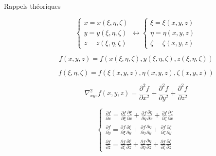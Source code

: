 \documentclass
[
a4paper,                      %
twoside,					  %
12pt,                         %
abstract,		      %
fleqn,                        %
]
{scrartcl} %
\begin{document}
\begin{description}

\item[Rappels th\'eoriques]

\begin{equation}
\begin{cases}
x=x\left(\xi,\eta,\zeta\right)\\
y=y\left(\xi,\eta,\zeta\right)\\
z=z\left(\xi,\eta,\zeta\right)
\end{cases}\longleftrightarrow\begin{cases}
\xi=\xi\left(x,y,z\right)\\
\eta=\eta\left(x,y,z\right)\\
\zeta=\zeta\left(x,y,z\right)
\end{cases}
\end{equation}

\begin{equation}
f\left(x,y,z\right)=f\left(x\left(\xi,\eta,\zeta\right),y\left(\xi,\eta,\zeta\right),z\left(\xi,\eta,\zeta\right)\right)
\end{equation}

\begin{equation}
f\left(\xi,\eta,\zeta\right)=f\left(\xi\left(x,y,z\right),\eta\left(x,y,z\right),\zeta\left(x,y,z\right)\right)
\end{equation}

\begin{equation}
\nabla_{xyz}^{2}f\left(x,y,z\right)=\frac{\partial^{2} f}{\partial x^{2}}+\frac{\partial^{2} f}{\partial y^{2}}+\frac{\partial^{2} f}{\partial z^{2}}
\end{equation}

\begin{equation}
\begin{cases}
\frac{\partial f}{\partial x}=\frac{\partial f}{\partial\xi}\frac{\partial\xi}{\partial x}+\frac{\partial f}{\partial\eta}\frac{\partial\eta}{\partial x}+\frac{\partial f}{\partial\zeta}\frac{\partial\zeta}{\partial x}\\[5pt]
\frac{\partial f}{\partial y}=\frac{\partial f}{\partial\xi}\frac{\partial\xi}{\partial y}+\frac{\partial f}{\partial\eta}\frac{\partial\eta}{\partial y}+\frac{\partial f}{\partial\zeta}\frac{\partial\zeta}{\partial y}\\[5pt]
\frac{\partial f}{\partial z}=\frac{\partial f}{\partial\xi}\frac{\partial\xi}{\partial z}+\frac{\partial f}{\partial\eta}\frac{\partial\eta}{\partial z}+\frac{\partial f}{\partial\zeta}\frac{\partial\zeta}{\partial z}
\end{cases}
\end{equation}


\end{description}
\end{document}
